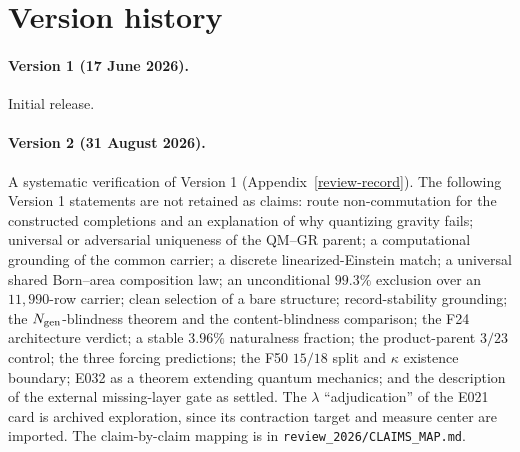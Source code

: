 \section{Version history}\label{adversarial-review-record}

\paragraph{Version 1 (17 June 2026).} Initial release.

\paragraph{Version 2 (31 August 2026).} A systematic verification of Version 1 (Appendix~\ref{review-record}). The
following Version 1 statements are not retained as claims: route non-commutation for the constructed completions and an
explanation of why quantizing gravity fails; universal or adversarial uniqueness of the QM--GR parent; a computational
grounding of the common carrier; a discrete linearized-Einstein match; a universal shared Born--area composition law;
an unconditional \(99.3\%\) exclusion over an \(11{,}990\)-row carrier; clean selection of a bare structure;
record-stability grounding; the \(N_{\rm gen}\)-blindness theorem and the content-blindness comparison; the F24
architecture verdict; a stable \(3.96\%\) naturalness fraction; the product-parent \(3/23\) control; the three forcing
predictions; the F50 \(15/18\) split and \(\kappa\) existence boundary; E032 as a theorem extending quantum mechanics;
and the description of the external missing-layer gate as settled. The \(\lambda\) ``adjudication'' of the E021 card
is archived exploration, since its contraction target and measure center are imported. The claim-by-claim mapping is
in \nolinkurl{review_2026/CLAIMS_MAP.md}.


